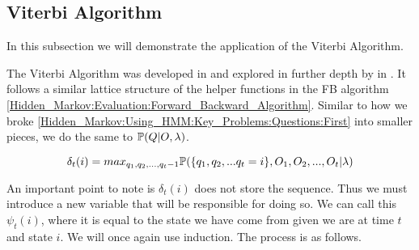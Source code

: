     \subsection{Viterbi Algorithm}
    \label{Hidden_Markov:Decoding:Vierbi_Algorithm}

    In this subsection we will demonstrate the application of the Viterbi Algorithm.

    The Viterbi Algorithm was developed in \cite{Viterbi1967} and explored in further depth by in \cite{Forney1973}. It follows a similar lattice structure of the helper functions in the FB algorithm \ref{Hidden_Markov:Evaluation:Forward_Backward_Algorithm}. Similar to how we broke \ref{Hidden_Markov:Using_HMM:Key_Problems:Questions:First} into smaller pieces, we do the same to $\mathbb{P} (Q | O, \lambda)$.

    \begin{equation}
        \delta_t(i)  = max_{q_1,q_2,...,q_t-1} \mathbb{P} (\{q_1,q_2,...q_t=i\},{O_1,O_2,...,O_t}|\lambda) 
    \end{equation}

    An important point to note is $\delta_t(i)$ does not store the sequence. Thus we must introduce a new variable that will be responsible for doing so. We can call this $\psi_t(i)$, where it is equal to the state we have come from given we are at time $t$ and state $i$. We will once again use induction. The process is as follows.


